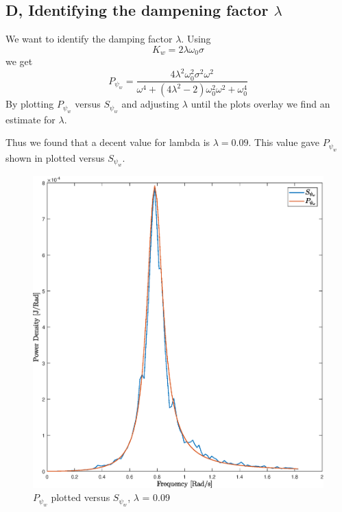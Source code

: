 \subsection{D, Identifying the dampening factor $\lambda$}
We want to identify the damping factor $\lambda$. Using 
$$K_w = 2\lambda\omega_0\sigma$$ 
we get 
$$P_{\psi_{w}} = \frac{4\lambda^2\omega_0^2\sigma^2\omega^2}{\omega^4+(4\lambda^2-2)\omega_0^2\omega^2+\omega_0^4}$$
By plotting $P_{\psi_w}$ versus $S_{\psi_w}$ and adjusting $\lambda$ until the plots overlay we find an estimate for $\lambda$. 

Thus we found that a decent value for lambda is $\lambda  = 0.09$. This value gave $P_{\psi_w}$ shown in  plotted versus $S_{\psi_w}$.


\begin{figure}
    \centering
    \includegraphics[width=1.00\textwidth]{figures/plots/P5p2d_lambda009rad.eps}
    \caption{$P_{\psi_w}$ plotted versus $S_{\psi_w}$, $\lambda$ = 0.09}
    \label{fig:PSD P vs S}
\end{figure}




